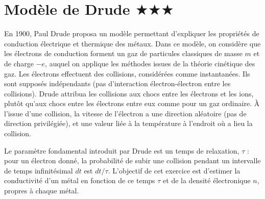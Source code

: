 \documentclass{report}
\begin{document}
\section*{Modèle de Drude $\bigstar\bigstar\bigstar$}

En 1900, Paul Drude proposa un modèle permettant d'expliquer les propriétés de conduction électrique et thermique des métaux. Dans ce modèle, on considère que les électrons de conduction forment un gaz de particules classiques de masse $m$ et de charge $-e$, auquel on applique les méthodes issues de la théorie cinétique des gaz. Les électrons effectuent des collisions, considérées comme instantanées. Ils sont supposés indépendants (pas d'interaction électron-électron entre les collisions). Drude attribua les collisions aux chocs entre les électrons et les ions, plutôt qu'aux chocs entre les électrons entre eux comme pour un gaz ordinaire. À l'issue d'une collision, la vitesse de l'électron a une direction aléatoire (pas de direction privilégiée), et une valeur liée à la température à l'endroit où a lieu la collision.

\vspace{0,4cm}

Le paramètre fondamental introduit par Drude est un temps de relaxation, $\tau$ : pour un électron donné, la probabilité de subir une collision pendant un intervalle de temps infinitésimal $dt$ est $dt/\tau$. L'objectif de cet exercice est d'estimer la conductivité d'un métal en fonction de ce temps $\tau$ et de la densité électronique $n$, propres à chaque métal. 
\end{document}
